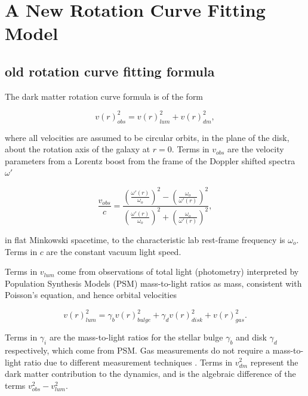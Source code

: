 \documentclass[reprint,%
 amsmath,amssymb,
 aps,
]{revtex4-1}
\begin{document}
\section{A New Rotation Curve Fitting Model   \label{sec:dos}}
 
 
 \subsection{old rotation curve fitting formula}
 
  

 The   dark matter rotation curve formula   is of the form

 \begin{equation}
v(r)^2_{obs}  =  v(r)^2_{lum}  +  v(r)^2_{dm},   
\label{eq:zonte1}
\end{equation} 

  where all velocities are assumed to be circular orbits, in the plane of the disk,  about the rotation axis of the galaxy at  $r=0$. 
Terms in  $v_{obs}$ are the velocity parameters  from a  Lorentz boost from the frame of the  Doppler shifted spectra $\omega'$
   

 \begin{equation}
 \frac{v_{obs} }{c}=
\frac{  \left( \frac{\omega'(r)}{\omega_o}\right)^2 -  \left( \frac{\omega_o}{\omega'(r)} \right)^2 }{  \left( \frac{\omega'(r)}{\omega_o}\right)^2  +  \left( \frac{\omega_o}{\omega'(r)}\right)^2 },
\label{eq:modelLumA}
\end{equation} 

 in flat Minkowski spacetime, to the 
  characteristic lab rest-frame frequency is $\omega_o$. Terms in $c$ are the constant vacuum light speed.  
  
  
 Terms in  $v_{lum}$ come from observations of total light  (photometry) interpreted by Population Synthesis Models (PSM) mass-to-light ratios as mass, consistent with Poisson's equation, and  hence orbital velocities  
  
   \begin{equation}
v(r)_{lum}^2 = \gamma_b v(r)_{bulge}^2 +  \gamma_d v(r)_{disk}^2 + v(r)_{gas}^2.    
\label{eq:zonte3}
\end{equation} 
  
 Terms in    $\gamma_i$  are the mass-to-light ratios for the stellar bulge $\gamma_b$ and disk $\gamma_d$ respectively, which come from PSM. Gas measurements do not require  a mass-to-light ratio due to different measurement techniques \citep{2016Lelli}.  
 Terms in $v^2_{dm}$ represent
the dark matter contribution to the dynamics, and is  the algebraic difference of the   terms  $v^2_{obs}-v^2_{lum}$. 
\end{document}
